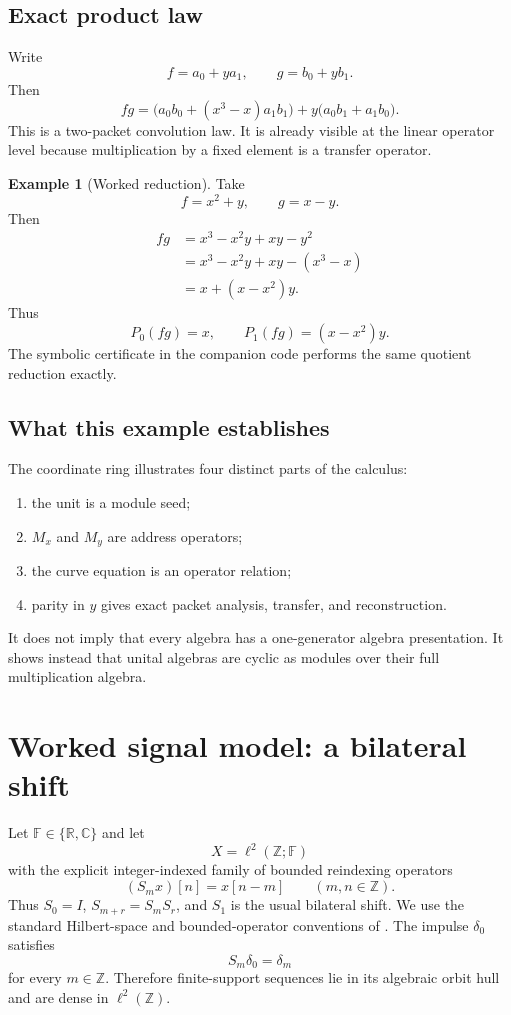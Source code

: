 \documentclass[11pt]{article}
\theoremstyle{definition}
\newtheorem{example}[theorem]{Example}
\theoremstyle{remark}
\newcommand{\Z}{\mathbb Z}
\newcommand{\C}{\mathbb C}
\newcommand{\R}{\mathbb R}
\begin{document}
\subsection{Exact product law}

Write
\[
f=a_0+ya_1,
\qquad
g=b_0+yb_1.
\]
Then
\[
{
fg
=
\bigl(a_0b_0+(x^3-x)a_1b_1\bigr)
+
y\bigl(a_0b_1+a_1b_0\bigr).
}
\]
This is a two-packet convolution law. It is already visible at the linear operator level because multiplication by a fixed element is a transfer operator.

\begin{example}[Worked reduction]
Take
\[
f=x^2+y,
\qquad
g=x-y.
\]
Then
\[
\begin{aligned}
fg
&=x^3-x^2y+xy-y^2\\
&=x^3-x^2y+xy-(x^3-x)\\
&=x+(x-x^2)y.
\end{aligned}
\]
Thus
\[
P_0(fg)=x,
\qquad
P_1(fg)=(x-x^2)y.
\]
The symbolic certificate in the companion code performs the same quotient reduction exactly.
\end{example}

\subsection{What this example establishes}

The coordinate ring illustrates four distinct parts of the calculus:
\begin{enumerate}[label=(\roman*)]
\item the unit is a module seed;
\item $M_x$ and $M_y$ are address operators;
\item the curve equation is an operator relation;
\item parity in $y$ gives exact packet analysis, transfer, and reconstruction.
\end{enumerate}
It does not imply that every algebra has a one-generator algebra presentation. It shows instead that unital algebras are cyclic as modules over their full multiplication algebra.

\section{Worked signal model: a bilateral shift}

Let $\mathbb{F}\in\{\R,\C\}$ and let
\[
X=\ell^2(\Z;\mathbb F)
\]
with the explicit integer-indexed family of bounded reindexing operators
\[
(S_mx)[n]=x[n-m]
\qquad(m,n\in\Z).
\]
Thus $S_0=I$, $S_{m+r}=S_mS_r$, and $S_1$ is the usual bilateral shift. We use the standard Hilbert-space and bounded-operator conventions of \cite{conway1990}.
The impulse $\delta_0$ satisfies
\[
S_m\delta_0=\delta_m
\]
for every $m\in\Z$. Therefore finite-support sequences lie in its algebraic orbit hull and are dense in $\ell^2(\Z)$.
\end{document}
